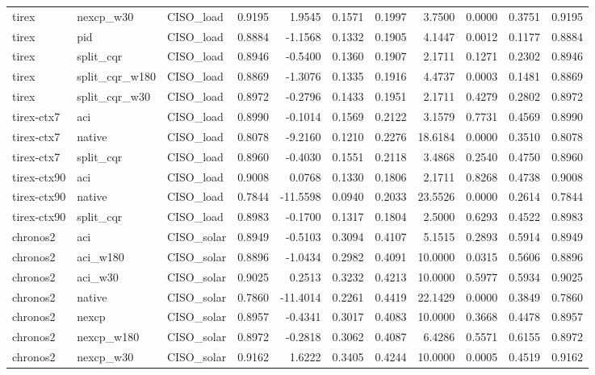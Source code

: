 \begin{tabular}{lllrrrrrrrr}
tirex & nexcp_w30 & CISO_load & 0.9195 & 1.9545 & 0.1571 & 0.1997 & 3.7500 & 0.0000 & 0.3751 & 0.9195 \\
tirex & pid & CISO_load & 0.8884 & -1.1568 & 0.1332 & 0.1905 & 4.1447 & 0.0012 & 0.1177 & 0.8884 \\
tirex & split_cqr & CISO_load & 0.8946 & -0.5400 & 0.1360 & 0.1907 & 2.1711 & 0.1271 & 0.2302 & 0.8946 \\
tirex & split_cqr_w180 & CISO_load & 0.8869 & -1.3076 & 0.1335 & 0.1916 & 4.4737 & 0.0003 & 0.1481 & 0.8869 \\
tirex & split_cqr_w30 & CISO_load & 0.8972 & -0.2796 & 0.1433 & 0.1951 & 2.1711 & 0.4279 & 0.2802 & 0.8972 \\
tirex-ctx7 & aci & CISO_load & 0.8990 & -0.1014 & 0.1569 & 0.2122 & 3.1579 & 0.7731 & 0.4569 & 0.8990 \\
tirex-ctx7 & native & CISO_load & 0.8078 & -9.2160 & 0.1210 & 0.2276 & 18.6184 & 0.0000 & 0.3510 & 0.8078 \\
tirex-ctx7 & split_cqr & CISO_load & 0.8960 & -0.4030 & 0.1551 & 0.2118 & 3.4868 & 0.2540 & 0.4750 & 0.8960 \\
tirex-ctx90 & aci & CISO_load & 0.9008 & 0.0768 & 0.1330 & 0.1806 & 2.1711 & 0.8268 & 0.4738 & 0.9008 \\
tirex-ctx90 & native & CISO_load & 0.7844 & -11.5598 & 0.0940 & 0.2033 & 23.5526 & 0.0000 & 0.2614 & 0.7844 \\
tirex-ctx90 & split_cqr & CISO_load & 0.8983 & -0.1700 & 0.1317 & 0.1804 & 2.5000 & 0.6293 & 0.4522 & 0.8983 \\
chronos2 & aci & CISO_solar & 0.8949 & -0.5103 & 0.3094 & 0.4107 & 5.1515 & 0.2893 & 0.5914 & 0.8949 \\
chronos2 & aci_w180 & CISO_solar & 0.8896 & -1.0434 & 0.2982 & 0.4091 & 10.0000 & 0.0315 & 0.5606 & 0.8896 \\
chronos2 & aci_w30 & CISO_solar & 0.9025 & 0.2513 & 0.3232 & 0.4213 & 10.0000 & 0.5977 & 0.5934 & 0.9025 \\
chronos2 & native & CISO_solar & 0.7860 & -11.4014 & 0.2261 & 0.4419 & 22.1429 & 0.0000 & 0.3849 & 0.7860 \\
chronos2 & nexcp & CISO_solar & 0.8957 & -0.4341 & 0.3017 & 0.4083 & 10.0000 & 0.3668 & 0.4478 & 0.8957 \\
chronos2 & nexcp_w180 & CISO_solar & 0.8972 & -0.2818 & 0.3062 & 0.4087 & 6.4286 & 0.5571 & 0.6155 & 0.8972 \\
chronos2 & nexcp_w30 & CISO_solar & 0.9162 & 1.6222 & 0.3405 & 0.4244 & 10.0000 & 0.0005 & 0.4519 & 0.9162 \\

\end{tabular}
